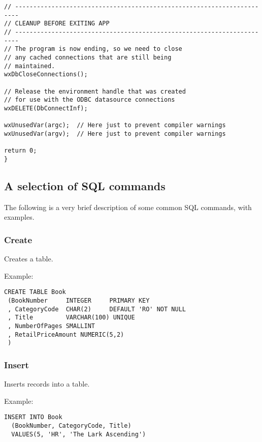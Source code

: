 \begin{verbatim}
// -----------------------------------------------------------------------
// CLEANUP BEFORE EXITING APP
// -----------------------------------------------------------------------
// The program is now ending, so we need to close
// any cached connections that are still being 
// maintained.
wxDbCloseConnections();

// Release the environment handle that was created
// for use with the ODBC datasource connections
wxDELETE(DbConnectInf);

wxUnusedVar(argc);  // Here just to prevent compiler warnings
wxUnusedVar(argv);  // Here just to prevent compiler warnings

return 0;
}
\end{verbatim}

\subsection{A selection of SQL commands}\label{sqlcommands}

The following is a very brief description of some common SQL commands, with
examples.



\subsubsection{Create}

Creates a table.

Example:

\begin{verbatim}
CREATE TABLE Book
 (BookNumber     INTEGER     PRIMARY KEY
 , CategoryCode  CHAR(2)     DEFAULT 'RO' NOT NULL
 , Title         VARCHAR(100) UNIQUE
 , NumberOfPages SMALLINT
 , RetailPriceAmount NUMERIC(5,2)
 )
\end{verbatim}

\subsubsection{Insert}

Inserts records into a table.

Example:

\begin{verbatim}
INSERT INTO Book
  (BookNumber, CategoryCode, Title)
  VALUES(5, 'HR', 'The Lark Ascending')
\end{verbatim}

